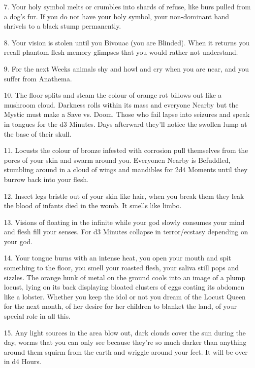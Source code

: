 7. Your holy symbol melts or crumbles into shards of refuse, like burs pulled from a dog's fur. If you do not have your holy symbol, your non-dominant hand shrivels to a black stump permanently.




8. Your vision is stolen until you Bivouac (you are Blinded). When it returns you recall phantom flesh memory glimpses that you would rather not understand.



9. For the next Weeks animals shy and howl and cry when you are near, and you suffer from Anathema.






10. The floor splits and steam the colour of orange rot billows out like a mushroom cloud. Darkness rolls within its mass and everyone Nearby but the Mystic must make a Save vs. Doom. Those who fail lapse into seizures and speak in tongues for the d3 Minutes. Days afterward they'll notice the swollen lump at the base of their skull.



11. Locusts the colour of bronze infested with corrosion pull themselves from the pores of your skin and swarm around you. Everyonen Nearby is Befuddled, stumbling around in a cloud of wings and mandibles for 2d4 Moments until they burrow back into your flesh.




12. Insect legs bristle out of your skin like hair, when you break them they leak the blood of infants died in the womb. It smells like limbo.



13. Visions of floating in the infinite while your god slowly consumes your mind and flesh fill your senses. For d3 Minutes collapse in terror/ecstasy depending on your god.




14. Your tongue burns with an intense heat, you open your mouth and spit something to the floor, you smell your roasted flesh, your saliva still pops and sizzles. The orange hunk of metal on the ground cools into an image of a plump locust, lying on its back displaying bloated clusters of eggs coating its abdomen like a lobster.
Whether you keep the idol or not you dream of the Locust Queen for the next month, of her desire for her children to blanket the land, of your special role in all this.




15. Any light sources in the area blow out, dark clouds cover the sun during the day, worms that you can only see because they're so much darker than anything around them squirm from the earth and wriggle around your feet. It will be over in d4 Hours.




